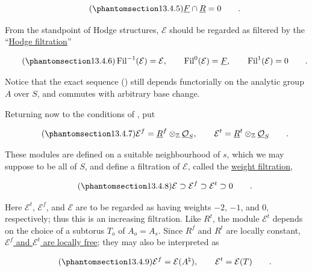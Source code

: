 \begin{equation}\tag{\SGARefTarget{sga7.sga7i.eix.n13-4-5}{13.4.5}}
 \underline F\cap\underline R=0\qquad .
\end{equation}

\noindent
From the standpoint of Hodge structures, $\mathcal E$ should be regarded
as filtered by the ``\underline{Hodge filtration}''

\begin{equation}\tag{\SGARefTarget{sga7.sga7i.eix.n13-4-6}{13.4.6}}
 \operatorname{Fil}^{-1}(\mathcal E)=\mathcal E,
 \qquad \operatorname{Fil}^{0}(\mathcal E)=\underline F,
 \qquad \operatorname{Fil}^{1}(\mathcal E)=0\qquad .
\end{equation}

\noindent
Notice that the exact sequence () still depends functorially on the
analytic group $A$ over $S$, and commutes with arbitrary base change.

Returning now to the conditions of , put

\begin{equation}\tag{\SGARefTarget{sga7.sga7i.eix.n13-4-7}{13.4.7}}
 \mathcal E^f=\underline R^f\otimes_{\mathbb Z}
 \underline{\mathcal O}_S,
 \qquad
 \mathcal E^t=\underline R^t\otimes_{\mathbb Z}
 \underline{\mathcal O}_S\qquad .
\end{equation}

\noindent
These modules are defined on a suitable neighbourhood of $s$, which we
may suppose to be all of $S$, and define a filtration of $\mathcal E$,
called the \underline{weight filtration},

\begin{equation}\tag{\SGARefTarget{sga7.sga7i.eix.n13-4-8}{13.4.8}}
 \mathcal E\supset\mathcal E^f\supset\mathcal E^t\supset0\qquad .
\end{equation}

\noindent
Here $\mathcal E^t$, $\mathcal E^f$, and $\mathcal E$ are to be regarded
as having weights $-2$, $-1$, and $0$, respectively; thus this is an
increasing filtration.  Like $R^t$, the module $\mathcal E^t$ depends on
the choice of a subtorus $T_o$ of $A_o=A_s$.  Since $R^f$ and $R^t$ are
locally constant, \underline{$\mathcal E^f$ and $\mathcal E^t$ are
locally free}; they may also be interpreted as

\begin{equation}\tag{\SGARefTarget{sga7.sga7i.eix.n13-4-9}{13.4.9}}
 \mathcal E^f=\mathcal E(A^\natural),
 \qquad \mathcal E^t=\mathcal E(T)\qquad .
\end{equation}

